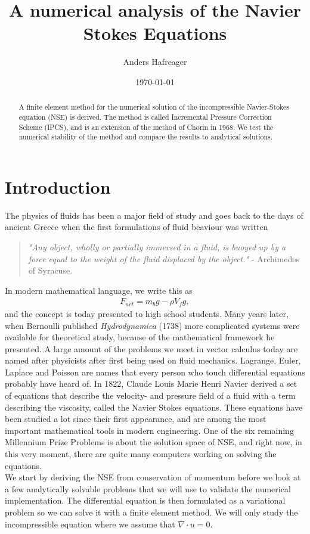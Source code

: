 \documentclass[a4paper,10pt]{article}
\title{A numerical analysis of the Navier Stokes Equations}
\date{\today}
\author{Anders Hafreager}
\renewcommand{\(}{\left(}
\renewcommand{\)}{\right)}
\begin{document}
\maketitle

\begin{abstract}
A finite element method for the numerical solution of the incompressible Navier-Stokes equation (NSE) is derived. The method is called Incremental Pressure Correction Scheme (IPCS)\cite{ns_numerical_solutions}, and is an extension of the method of Chorin in 1968\cite{chorin}. We test the numerical stability of the method and compare the results to analytical solutions.
\end{abstract}

\section{Introduction}
The physics of fluids has been a major field of study and goes back to the days of ancient Greece \cite{wiki_fluid_mechanics} when the first formulations of fluid beaviour was written
\begin{quote}
\textit{"Any object, wholly or partially immersed in a fluid, is buoyed up by a force equal to the weight of the fluid displaced by the object."} - Archimedes of Syracuse.
\end{quote}
In modern mathematical language, we write this as 
\begin{align*}
  F_{net} = m_bg - \rho V_f g,
\end{align*}
and the concept is today presented to high school students. Many years later, when Bernoulli published \textit{Hydrodynamica} (1738) more complicated systems were available for theoretical study, because of the mathematical framework he presented. A large amount of the problems we meet in vector calculus today are named after physicists after first being used on fluid mechanics. Lagrange, Euler, Laplace and Poisson are names that every person who touch differential equations probably have heard of. In 1822, Claude Louis Marie Henri Navier derived a set of equations that describe the velocity- and pressure field of a fluid with a term describing the viscosity, called the Navier Stokes equations.\cite{ns_history} These equations have been studied a lot since their first appearance, and are among the most important mathematical tools in modern engineering. One of the six remaining Millennium Prize Problems is about the solution space of NSE\cite{millennium}, and right now, in this very moment, there are quite many computers working on solving the equations. \\
We start by deriving the NSE from conservation of momentum before we look at a few analytically solvable problems that we will use to validate the numerical implementation. The differential equation is then formulated as a variational problem so we can solve it with a finite element method. We will only study the incompressible equation where we assume that $\nabla \cdot u = 0$. 
 
\end{document}
